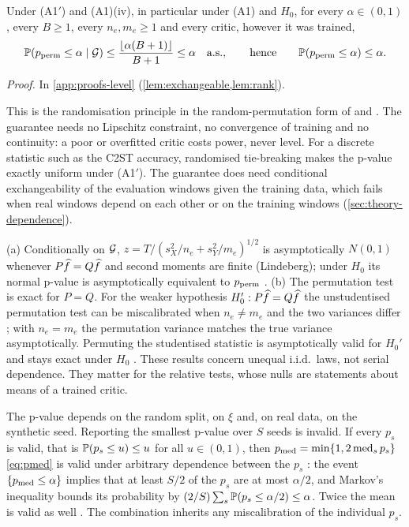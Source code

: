 \begin{proposition}\label{prop:exact-level}
Under (A1$'$) and (A1)(iv), in particular under (A1) and $H_0$, for every $\alpha\in(0,1)$, every
$B\ge1$, every $n_e,m_e\ge1$ and every critic, however it was trained,
\[
  \mathbb{P}(p_{\mathrm{perm}}\le\alpha\mid\mathcal{G})\le\frac{\lfloor\alpha(B+1)\rfloor}{B+1}\le\alpha\quad\text{a.s.},
  \qquad\text{hence}\qquad \mathbb{P}(p_{\mathrm{perm}}\le\alpha)\le\alpha .
\]
\end{proposition}
\noindent\textit{Proof.} In \cref{app:proofs-level} (\cref{lem:exchangeable,lem:rank}).

This is the randomisation principle \citep{lehmann2022testing} in the random-permutation form of
\citet{phipson2010permutation} and \citet{hemerik2018exact}. The guarantee needs no Lipschitz
constraint, no convergence of training and no continuity: a poor or overfitted critic costs power,
never level. For a discrete statistic such as the C2ST accuracy, randomised tie-breaking makes the
p-value exactly uniform under (A1$'$). The guarantee does need conditional exchangeability of the
evaluation windows given the training data, which fails when real windows depend on each other or
on the training windows (\cref{sec:theory-dependence}).

\begin{remark}\label{rem:studentised}
(a) Conditionally on $\mathcal{G}$, $z=T/(s_X^2/n_e+s_Y^2/m_e)^{1/2}$ is asymptotically $N(0,1)$
whenever $P\widehat{f}=Q\widehat{f}$ and second moments are finite (Lindeberg); under $H_0$ its normal p-value
is asymptotically equivalent to $p_{\mathrm{perm}}$ \citep{hoeffding_1952_large}.
(b) The permutation test is exact for $P=Q$. For the weaker hypothesis $H_0':P\widehat{f}=Q\widehat{f}$ the
unstudentised permutation test can be miscalibrated when $n_e\neq m_e$ and the two variances
differ \citep{romano_1990_behavior}; with $n_e=m_e$ the permutation variance matches the true
variance asymptotically. Permuting the studentised statistic is asymptotically valid for $H_0'$
and stays exact under $H_0$ \citep{janssen1997studentized,chung2013exact}. These results concern
unequal i.i.d.\ laws, not serial dependence. They matter for the relative tests, whose nulls are
statements about means of a trained critic.
\end{remark}

\begin{remark}\label{rem:combine-seeds}
The p-value depends on the random split, on $\xi$ and, on real data, on the synthetic seed.
Reporting the smallest p-value over $S$ seeds is invalid. If every $p_s$ is valid, that is
$\mathbb{P}(p_s\le u)\le u$ for all $u\in(0,1)$, then $p_{\mathrm{med}}=\min\{1,2\operatorname{med}_sp_s\}$ \eqref{eq:pmed} is
valid under arbitrary dependence between the $p_s$ \citep{meinshausen_2009_pvalues}: the event
$\{p_{\mathrm{med}}\le\alpha\}$ implies that at least $S/2$ of the $p_s$ are at most $\alpha/2$, and Markov's
inequality bounds its probability by $(2/S)\sum_s\mathbb{P}(p_s\le\alpha/2)\le\alpha$. Twice the mean
is valid as well \citep{vovk_2020_combining}. The combination inherits any miscalibration of the
individual $p_s$.
\end{remark}

